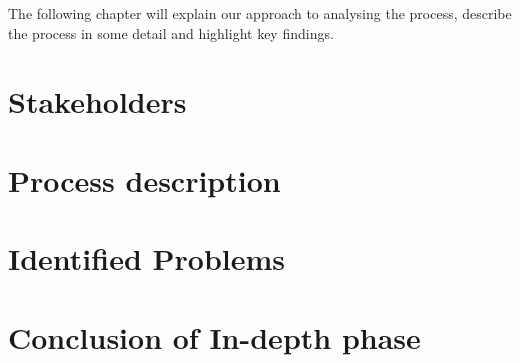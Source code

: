 The following chapter will explain our approach to analysing the process, describe the process in some detail and highlight key findings.

\section{Stakeholders}

\section{Process description}

\section{Identified Problems}

\section{Conclusion of In-depth phase}
